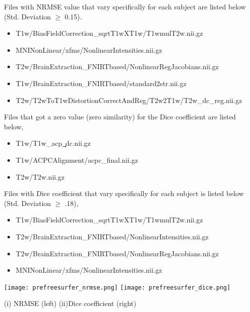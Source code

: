 Files with NRMSE value that vary specifically for each subject are listed below (Std. Deviation $\geq$ 0.15).
\begin{itemize}
  \item T1w/BiasFieldCorrection\_sqrtT1wXT1w/T1wmulT2w.nii.gz
  \item MNINonLinear/xfms/NonlinearIntensities.nii.gz
  \item T2w/BrainExtraction\_FNIRTbased/NonlinearRegJacobians.nii.gz
  \item T1w/BrainExtraction\_FNIRTbased/standard2str.nii.gz
  \item T2w/T2wToT1wDistortionCorrectAndReg/T2w2T1w/T2w\_dc\_reg.nii.gz
\end{itemize}

Files that got a zero value (zero similarity) for the Dice coefficient are listed below,
\begin{itemize}
\item T1w/T1w\_acp\c\_dc.nii.gz
\item T1w/ACPCAlignment/acpc\_final.nii.gz
\item T2w/T2w.nii.gz
\end{itemize}

Files with Dice coefficient that vary specifically for each subject is listed below (Std. Deviation $\geq$ .18),
\begin{itemize}
\item T1w/BiasFieldCorrection\_sqrtT1wXT1w/T1wmulT2w.nii.gz
\item T2w/BrainExtraction\_FNIRTbased/NonlinearIntensities.nii.gz
\item T2w/BrainExtraction\_FNIRTbased/NonlinearRegJacobians.nii.gz
\item MNINonLinear/xfms/NonlinearIntensities.nii.gz
\end{itemize}

\begin{center}
\texttt{[image: prefreesurfer\_nrmse.png]}%
\texttt{[image: prefreesurfer\_dice.png]}
\caption*{(i) NRMSE (left) (ii)Dice coefficient (right)}
\label{fig:prefreesurfer_metric_values}
\end{center}

